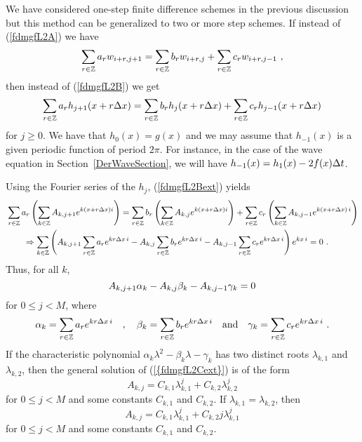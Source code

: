\begin{rmk}
We have considered one-step finite difference schemes in the previous
discussion but this method can be generalized to two or more step
schemes.  If instead of (\ref{fdmgfL2A}) we have
\begin{equation}\label{fdmgfL2Aext}
\sum_{r\in\ZZ} a_r w_{i+r,j+1} =
\sum_{r\in \ZZ} b_r w_{i+r,j} + \sum_{r\in \ZZ} c_r w_{i+r,j-1} \ ,
\end{equation}
then instead of (\ref{fdmgfL2B}) we get
\begin{equation}\label{fdmgfL2Bext}
\sum_{r\in\mathbb{Z}} a_r h_{j+1}(x+r\Delta{x}) =
\sum_{r\in\mathbb{Z}} b_r h_{j}(x+r\Delta{x})
+ \sum_{r\in\mathbb{Z}} c_r h_{j-1}(x+r\Delta{x})
\end{equation}
for $j\geq 0$.  We have that $h_0(x) = g(x)$ and we may assume that
$h_{-1}(x)$ is a given periodic function of period $2\pi$.  For
instance, in the case of the wave equation in
Section~\ref{DerWaveSection}, we will have
$h_{-1}(x) = h_1(x) - 2 f(x) \Delta{t}$.   \label{fdmgfL2ext}

Using the Fourier series of the $h_j$, (\ref{fdmgfL2Bext}) yields
\begin{align*}
& \sum_{r\in\mathbb{Z}} a_r \left( \sum_{k\in \mathbb{Z}} A_{k,j+1} e^{k(x+r\Delta{x}) i}\right)
= \sum_{r\in\mathbb{Z}} b_r \left( \sum_{k\in \mathbb{Z}} A_{k,j} e^{k (x+r\Delta{x}) i}\right) 
+ \sum_{r\in\mathbb{Z}} c_r \left( \sum_{k\in \mathbb{Z}} A_{k,j-1} e^{k(x+r\Delta{x})\,i}\right)
\\
& \qquad \Rightarrow
\sum_{k\in \mathbb{Z}}\left(A_{k,j+1}
\sum_{r\in\mathbb{Z}} a_r e^{k r \Delta{x}\, i}
- A_{k,j}  \sum_{r\in\mathbb{Z}} b_r  e^{k r \Delta{x}\, i}
- A_{k,j-1} \sum_{r\in\mathbb{Z}} c_r  e^{k r \Delta{x}\, i}\right) e^{k x\,i} = 0 \ .
\end{align*}
Thus, for all $k$,
\begin{equation}\label{{fdmgfL2Cext}}
  A_{k,j+1} \alpha_k -  A_{k,j}  \beta_k - A_{k,j-1} \gamma_k = 0
\end{equation}
for $0\leq j < M$, where
\begin{equation} \label{{fdmgfL2Dext}}
\alpha_k = \sum_{r\in\ZZ} a_r e^{k r \dtx{x}\, i} \quad , \quad
\beta_k = \sum_{r\in\ZZ} b_r  e^{k r \dtx{x}\, i} \quad \text{and} \quad
\gamma_k = \sum_{r\in\ZZ} c_r  e^{k r \dtx{x}\, i} \ .
\end{equation}
If the characteristic polynomial
$\alpha_k \lambda^2 - \beta_k \lambda - \gamma_k$ has two distinct
roots $\lambda_{k,1}$ and $\lambda_{k,2}$, then the general solution of
(\ref{{fdmgfL2Cext}}) is of the form
\[
A_{k,j} = C_{k,1} \lambda_{k,1}^j + C_{k,2} \lambda_{k,2}^j 
\]
for $0 \leq j < M$ and some constants $C_{k,1}$ and $C_{k,2}$.  If
$\lambda_{k,1} = \lambda_{k,2}$, then
\[
A_{k,j} = C_{k,1} \lambda_{k,1}^j + C_{k,2} j \lambda_{k,1}^j 
\]
for $0 \leq j < M$ and some constants $C_{k,1}$ and $C_{k,2}$.


\end{rmk}
